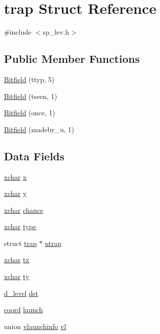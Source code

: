 \hypertarget{structtrap}{\section{trap Struct Reference}
\label{structtrap}
}


{\ttfamily \#include $<$sp\+\_\+lev.\+h$>$}

\subsection*{Public Member Functions}
\begin{DoxyCompactItemize}
\item 
\hyperlink{structtrap_adf204fe8fa4a221f35a3ed5090ecb658}{Bitfield} (ttyp, 5)
\item 
\hyperlink{structtrap_a90955c6df85cbc42dba3357297827506}{Bitfield} (tseen, 1)
\item 
\hyperlink{structtrap_ab01ad7ba0145830b5b92d49bd52818cd}{Bitfield} (once, 1)
\item 
\hyperlink{structtrap_ab2b7618c12002d22fd843ea2e5a78489}{Bitfield} (madeby\+\_\+u, 1)
\end{DoxyCompactItemize}
\subsection*{Data Fields}
\begin{DoxyCompactItemize}
\item 
\hyperlink{global_8h_a2043b7d01ce89f4ee2fa6c345a752d32}{xchar} \hyperlink{structtrap_aed25254cf556e3eae09dd98576d98d45}{x}
\item 
\hyperlink{global_8h_a2043b7d01ce89f4ee2fa6c345a752d32}{xchar} \hyperlink{structtrap_a3c7f72724bfcd0c4acb2a05ee75064df}{y}
\item 
\hyperlink{global_8h_a2043b7d01ce89f4ee2fa6c345a752d32}{xchar} \hyperlink{structtrap_a641c9896c51efde6d757cc1903209c98}{chance}
\item 
\hyperlink{global_8h_a2043b7d01ce89f4ee2fa6c345a752d32}{xchar} \hyperlink{structtrap_a6433bf21fd55f30507100598399aa727}{type}
\item 
struct \hyperlink{structtrap}{trap} $\ast$ \hyperlink{structtrap_aef8ea4650dce701fde7f7f3e1310c892}{ntrap}
\item 
\hyperlink{global_8h_a2043b7d01ce89f4ee2fa6c345a752d32}{xchar} \hyperlink{structtrap_a8a3d31070852119ee66c8662b0c883c7}{tx}
\item 
\hyperlink{global_8h_a2043b7d01ce89f4ee2fa6c345a752d32}{xchar} \hyperlink{structtrap_a579c4f0e2d31e3657c930d6741737b20}{ty}
\item 
\hyperlink{structd__level}{d\+\_\+level} \hyperlink{structtrap_a7f0184c96889b0dfba889dbb18a06828}{dst}
\item 
\hyperlink{structcoord}{coord} \hyperlink{structtrap_acac0e6caed6e2b539423bef3e0ff5a87}{launch}
\item 
union \hyperlink{unionvlaunchinfo}{vlaunchinfo} \hyperlink{structtrap_a29973ce0aef5c50240f86e0fc8d63fe9}{vl}
\end{DoxyCompactItemize}


